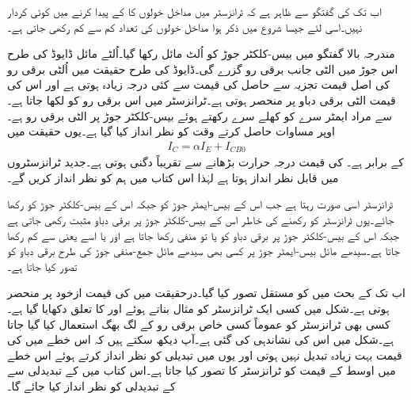 اب تک کی گفتگو سے ظاہر ہے کہ  ٹرانزسٹر میں مداخل خولوں کا   کے پیدا کرنے میں کوئی کردار نہیں۔اسی لئے جیسا شروع میں ذکر ہوا مداخل خولوں کی تعداد کم سے کم رکھی جاتی ہے۔

مندرجہ بالا گفتگو میں بیس-کلکٹر جوڑ کو اُلٹ مائل رکھا گیا۔اُلٹے مائل ڈایوڈ کی طرح اس جوڑ میں الٹی جانب برقی رو  گزرے گی۔ڈایوڈ کی طرح حقیقت میں اُلٹی برقی رو کی اصل قیمت تجزیہ سے حاصل  کی قیمت سے کئی درجہ زیادہ ہوتی ہے اور اس کی قیمت الٹی برقی دباو پر منحصر ہوتی ہے۔ٹرانزسٹر میں اس برقی رو کو  لکھا جاتا ہے۔  سے مراد ایمٹر سرے کو کھلے سرے رکھتے ہوئے بیس-کلکٹر جوڑ پر الٹی برقی رو ہے۔اوپر مساوات حاصل کرتے وقت   کو نظر انداز کیا گیا ہے۔یوں حقیقت میں
\begin{align}
I_C=\alpha I_E+I_{CB0}
\end{align}
کے برابر ہے۔ کی قیمت درجہ حرارت  بڑھانے سے تقریباً دگنی ہوتی ہے۔جدید ٹرانزسٹروں میں  قابل نظر انداز ہوتا ہے لہٰذا اس کتاب میں ہم  کو نظر انداز کریں گے۔

 ٹرانزسٹر اسی صورت   رہتا ہے جب اس کے بیس-ایمٹر  جوڑ کو  جبکہ اس کے بیس-کلکٹر جوڑ کو  رکھا جائے۔یوں ٹرانزسٹر کو  رکھنے کی خاطر اس کے بیس-کلکٹر جوڑ پر برقی دباو  مثبت رکھی جاتی ہے جبکہ اس کے بیس-کلکٹر جوڑ پر برقی دباو  کو یا تو منفی رکھا جاتا ہے اور یا اسے  یعنی  سے کم رکھا جاتا ہے۔سیدھے مائل بیس-ایمٹر  جوڑ پر کسی بھی سیدھے مائل جمع-منفی جوڑ کی طرح برقی دباو کو  تصور کیا جاتا ہے۔


اب تک کے بحث میں  کو مستقل تصور کیا گیا۔درحقیقت میں  کی قیمت ازخود  پر منحصر ہوتی ہے۔شکل  میں کسی ایک ٹرانزسٹر کو مثال بناتے ہوئے   اور  کا تعلق دکھایا گیا ہے۔کسی بھی ٹرانزسٹر کو عموماً کسی خاص برقی رو کے لگ بھگ استعمال کیا گیا جاتا ہے۔شکل میں اس کی نشاندہی کی گئی ہے۔آپ دیکھ سکتے ہیں کہ اس خطے میں  کی قیمت بہت زیادہ  تبدیل نہیں ہوتی اور یوں  میں تبدیلی کو نظر انداز کرتے ہوئے  اس خطے میں  اوسط  کے قیمت کو ٹرانزسٹر کا  تصور کیا جاتا  ہے۔اس کتاب میں  کے تبدیدلی سے   کے تبدیدلی کو نظر انداز کیا جائے گا۔ 

